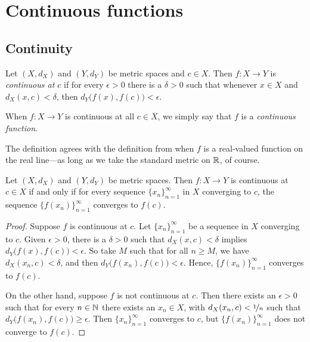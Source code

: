
\sectionnewpage
\section{Continuous functions}
\label{sec:metcont}



\subsection{Continuity}

\begin{defn}
Let $(X,d_X)$ and $(Y,d_Y)$ be metric spaces and $c \in X$.
Then $f \colon X \to Y$ is
\emph{continuous at $c$}
if for every $\epsilon > 0$
there is a $\delta > 0$ such that whenever $x \in X$ and $d_X(x,c) <
\delta$, then
$d_Y\bigl(f(x),f(c)\bigr) < \epsilon$.

\medskip

When $f \colon X \to Y$ is continuous at all $c \in X$, we simply say
that $f$ is a \emph{continuous function}.
\end{defn}

The definition agrees with the definition from  when
$f$ is a real-valued function on the real line---as long as we take the standard
metric on ${\mathbb{R}}$, of course.

\begin{prop} \label{prop:contiscont}
Let $(X,d_X)$ and $(Y,d_Y)$ be metric spaces.
Then $f \colon X \to Y$ is
continuous at $c \in X$
if and only if for every sequence $\{ x_n \}_{n=1}^\infty$ in $X$
converging to $c$, the sequence $\bigl\{ f(x_n) \bigr\}_{n=1}^\infty$ converges
to $f(c)$.
\end{prop}

\begin{proof}
Suppose $f$ is continuous at $c$.  Let $\{ x_n \}_{n=1}^\infty$ be a
sequence in $X$ converging to $c$.  Given $\epsilon > 0$,
there is a $\delta > 0$ such that $d_X(x,c) < \delta$ implies
$d_Y\bigl(f(x),f(c)\bigr) < \epsilon$.  So take $M$ such that
for all $n \geq M$, we have $d_X(x_n,c) < \delta$, and then
$d_Y\bigl(f(x_n),f(c)\bigr) < \epsilon$.  Hence, $\bigl\{ f(x_n) \bigr\}_{n=1}^\infty$
converges to $f(c)$.

On the other hand, suppose $f$ is not continuous at $c$.
Then there exists an $\epsilon > 0$
such that for every $n \in {\mathbb{N}}$ there exists an $x_n \in X$,
with
$d_X(x_n,c) < \nicefrac{1}{n}$ such that $d_Y\bigl(f(x_n),f(c)\bigr) \geq
\epsilon$.  Then $\{ x_n \}_{n=1}^\infty$ converges to $c$, but
$\bigl\{ f(x_n) \bigr\}_{n=1}^\infty$
does not converge to $f(c)$.
\end{proof}

